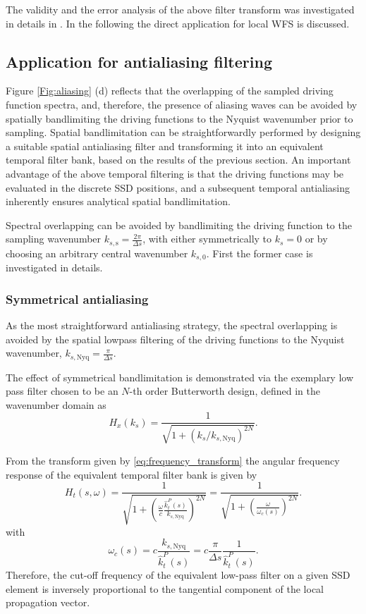 \documentclass[conference]{IEEEtran}
\begin{document}
The validity and the error analysis of the above filter transform was investigated in details in \cite{Firtha DAGA2023}.
In the following the direct application for local WFS is discussed.

\subsection{Application for antialiasing filtering}

Figure \ref{Fig:aliasing} (d) reflects that the overlapping of the sampled driving function spectra, and, therefore, the presence of aliasing waves can be avoided by spatially bandlimiting the driving functions to the Nyquist wavenumber prior to sampling.
Spatial bandlimitation can be straightforwardly performed by designing a suitable spatial antialiasing filter and transforming it into an equivalent temporal filter bank, based on the results of the previous section.
An important advantage of the above temporal filtering is that the driving functions may be evaluated in the discrete SSD positions, and a subsequent temporal antialiasing inherently ensures analytical spatial bandlimitation.

Spectral overlapping can be avoided by bandlimiting the driving function to the sampling wavenumber $k_{s,\mathrm{s}} = \frac{2\pi}{\Delta s}$, with either symmetrically to $k_s = 0$ or by choosing an arbitrary central wavenumber $k_{s,0}$.
First the former case is investigated in details.

\subsubsection{Symmetrical antialiasing}
As the most straightforward antialiasing strategy, the spectral overlapping is avoided by the spatial lowpass filtering of the driving functions to the Nyquist wavenumber, $k_{s,\mathrm{Nyq}} = \frac{\pi}{\Delta s}$.

The effect of symmetrical bandlimitation is demonstrated via the exemplary low pass filter chosen to be an $N$-th order Butterworth design, defined in the wavenumber domain as
\begin{equation}
    H_x(k_s) = \frac{ 1 }{ \sqrt{ 1 + \left( k_s / k_{s,\mathrm{Nyq}} \right)^{2N} } }.
\end{equation}

From the transform given by \eqref{eq:frequency_transform} the angular frequency response of the equivalent temporal filter bank is given by
\begin{equation}
    H_t(s,\omega) = \frac{ 1 }{ \sqrt{ 1 + \left( \frac{\omega}{c}\frac{\hat{k}_t^P(s)}{k_{s,\mathrm{Nyq}}}  \right)^{2N} } } =  \frac{ 1 }{ \sqrt{ 1 + \left( \frac{\omega}{\omega_c(s)}  \right)^{2N} } } .
\end{equation}
with
\begin{equation}
    \omega_c(s) = c \frac{k_{s,\mathrm{Nyq}}}{\hat{k}_t^P(s)} = c\frac{ \pi}{\Delta s} \frac{1}{\hat{k}_t^P(s)}.
    \label{eq:cutoff_fr}
\end{equation}
Therefore, the cut-off frequency of the equivalent low-pass filter on a given SSD element is inversely proportional to the tangential component of the local propagation vector.
\end{document}
